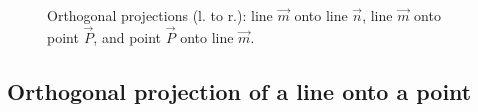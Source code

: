 \documentclass[12pt]{article}
\begin{document}
 \begin{figure}
  \centering
{\setlength\fboxsep{0pt}}\hspace{.02in}
{\setlength\fboxsep{0pt}}\hspace{.02in}
{\setlength\fboxsep{0pt}}
\caption{Orthogonal projections (l. to r.): line $\vec{m}$ onto line $\vec{n}$,  line $\vec{m}$ onto point $\vec{P}$, and point  $\vec{P}$  onto line $\vec{m}$.}
\label{fig:orthProj}
\end{figure}



\subsection{Orthogonal projection of a line onto a point}
\end{document}
